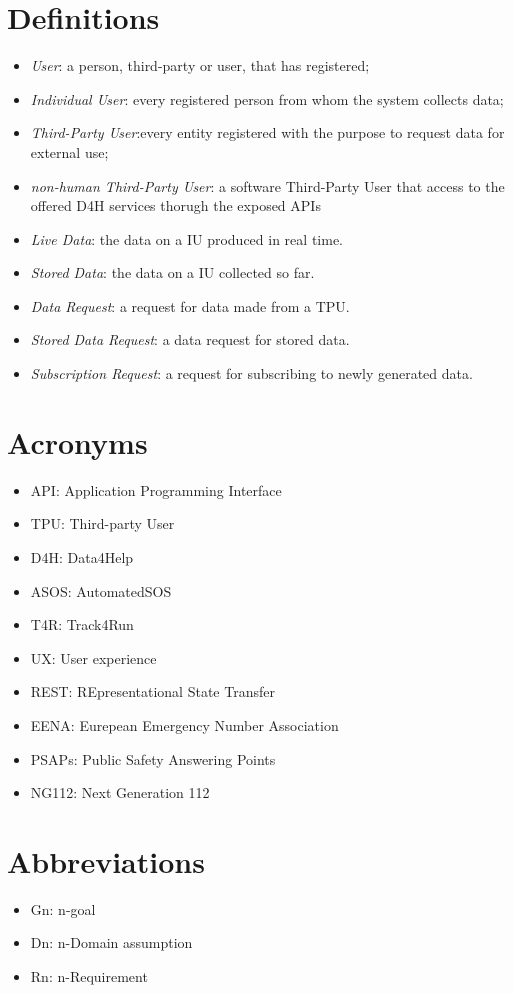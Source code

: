 \section{Definitions}
\begin{itemize}
\item \textit{User}: a person, third-party or user, that has registered;
\item \textit{Individual User}: every registered person from whom the system collects data; 
\item \textit{Third-Party User}:every entity registered with the purpose to request data for external use;
\item \textit{non-human Third-Party User}: a software Third-Party User that access to the offered D4H services thorugh the exposed APIs
\item \textit{Live Data}: the data on a IU produced in real time.
\item \textit{Stored Data}: the data on a IU collected so far.
\item \textit{Data Request}: a request for data made from a TPU.
\item \textit{Stored Data Request}: a data request for stored data.
\item \textit{Subscription Request}: a request for subscribing to newly generated data.
\end{itemize}
\section{Acronyms}
\begin{itemize}
\item API: Application Programming Interface
\item TPU: Third-party User
\item	D4H: Data4Help
\item	ASOS: AutomatedSOS
\item	T4R: Track4Run
\item UX: User experience
\item REST: REpresentational State Transfer
\item EENA: Eurepean Emergency Number Association
\item PSAPs: Public Safety Answering Points
\item NG112: Next Generation 112
\end{itemize}

\section{Abbreviations}
\begin{itemize}
\item Gn: n-goal
\item Dn: n-Domain assumption
\item Rn: n-Requirement
\end{itemize}

